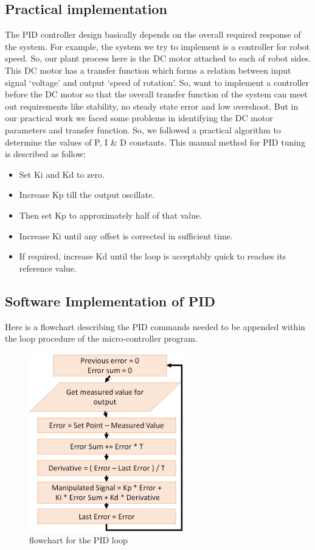 \documentclass[12pt]{book}
\begin{document}
	\subsection{Practical implementation}
	The PID controller design basically depends on the overall required response of the system. For example, the system we try to implement is a controller for robot speed. So, our plant process here is the DC motor attached to each of robot sides. This DC motor has a transfer function which forms a relation between input signal ‘voltage’ and output ‘speed of rotation’. So, want to implement a controller before the DC motor so that the overall transfer function of the system can meet out requirements like stability, no steady state error and low overshoot.
	But in our practical work we faced some problems in identifying the DC motor parameters and transfer function. So, we followed a practical algorithm to determine the values of P, I \& D constants. This manual method for PID tuning is described as follow:
	\begin{itemize}
		\item Set Ki and Kd to zero.
		\item Increase Kp till the output oscillate.
		\item Then set Kp to approximately half of that value.
		\item Increase Ki until any offset is corrected in sufficient time.
		\item If required, increase Kd until the loop is acceptably quick to reaches its reference value. 
	\end{itemize}


	\subsection{Software Implementation of PID}
	Here is a flowchart describing the PID commands needed to be appended within the loop procedure of the micro-controller program.
	\begin{figure}[H]
		\centering
		\includegraphics[width = 0.6\textwidth]{Fig/pid.png}
		\caption{flowchart for the PID loop}
		\label{fig:pid}
	\end{figure}
\end{document}
